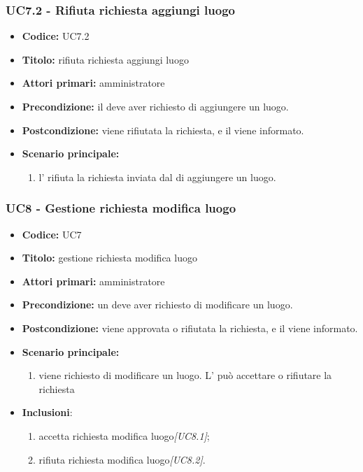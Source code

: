 \documentclass[casi-duso]{subfiles}
\begin{document}
\subsubsection{UC7.2 - Rifiuta richiesta aggiungi luogo}
\label{subsub:UC7.2}
\begin{itemize}
  \item \textbf{Codice:} UC7.2
  \item \textbf{Titolo:} rifiuta richiesta aggiungi luogo
  \item \textbf{Attori primari:} amministratore
  \item \textbf{Precondizione:} il  deve aver richiesto di aggiungere un luogo.
  \item \textbf{Postcondizione:} viene rifiutata la richiesta, e il  viene informato.
  \item \textbf{Scenario principale:} 
  \begin{enumerate}
    \item l' rifiuta la richiesta inviata dal  di aggiungere un luogo.
  \end{enumerate}
\end{itemize}

\subsubsection{UC8 - Gestione richiesta modifica luogo}
\label{subsub:UC8}
\begin{itemize}
  \item \textbf{Codice:} UC7
  \item \textbf{Titolo:} gestione richiesta modifica luogo
  \item \textbf{Attori primari:} amministratore
  \item \textbf{Precondizione:} un  deve aver richiesto di modificare un luogo.
  \item \textbf{Postcondizione:} viene approvata o rifiutata la richiesta, e il  viene informato.
  \item \textbf{Scenario principale:} 
  \begin{enumerate}
    \item viene richiesto di modificare un luogo. L' può accettare o rifiutare la richiesta
  \end{enumerate}
  \item \textbf{Inclusioni}:
  \begin{enumerate}
    \item accetta richiesta modifica luogo\emph{[UC8.1]};
    \item rifiuta richiesta modifica luogo\emph{[UC8.2]}.
  \end{enumerate}
\end{itemize}
\end{document}
